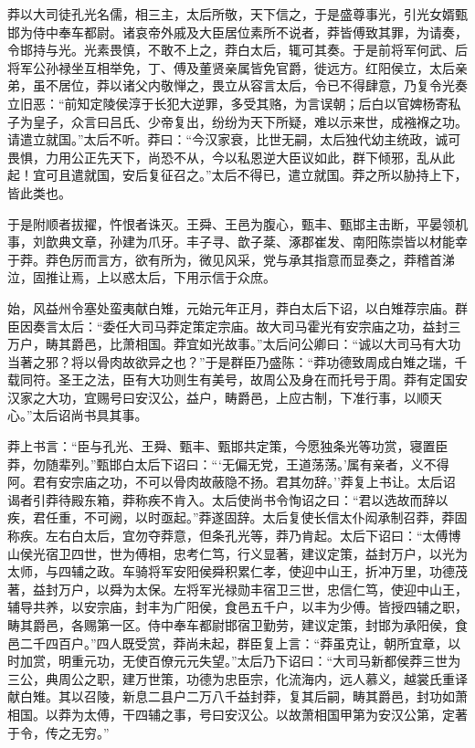 \documentclass[]{article}
\begin{document}
莽以大司徒孔光名儒，相三主，太后所敬，天下信之，于是盛尊事光，引光女婿甄邯为侍中奉车都尉。诸哀帝外戚及大臣居位素所不说者，莽皆傅致其罪，为请奏，令邯持与光。光素畏慎，不敢不上之，莽白太后，辄可其奏。于是前将军何武、后将军公孙禄坐互相举免，丁、傅及董贤亲属皆免官爵，徙远方。红阳侯立，太后亲弟，虽不居位，莽以诸父内敬惮之，畏立从容言太后，令已不得肆意，乃复令光奏立旧恶：``前知定陵侯淳于长犯大逆罪，多受其赂，为言误朝；后白以官婢杨寄私子为皇子，众言曰吕氏、少帝复出，纷纷为天下所疑，难以示来世，成襁褓之功。请遣立就国。''太后不听。莽曰：``今汉家衰，比世无嗣，太后独代幼主统政，诚可畏惧，力用公正先天下，尚恐不从，今以私恩逆大臣议如此，群下倾邪，乱从此起！宜可且遣就国，安后复征召之。''太后不得已，遣立就国。莽之所以胁持上下，皆此类也。

于是附顺者拔擢，忤恨者诛灭。王舜、王邑为腹心，甄丰、甄邯主击断，平晏领机事，刘歆典文章，孙建为爪牙。丰子寻、歆子棻、涿郡崔发、南阳陈崇皆以材能幸于莽。莽色厉而言方，欲有所为，微见风采，党与承其指意而显奏之，莽稽首涕泣，固推让焉，上以惑太后，下用示信于众庶。

始，风益州令塞处蛮夷献白雉，元始元年正月，莽白太后下诏，以白雉荐宗庙。群臣因奏言太后：``委任大司马莽定策定宗庙。故大司马霍光有安宗庙之功，益封三万户，畴其爵邑，比萧相国。莽宜如光故事。''太后问公卿曰：``诚以大司马有大功当著之邪？将以骨肉故欲异之也？''于是群臣乃盛陈：``莽功德致周成白雉之瑞，千载同符。圣王之法，臣有大功则生有美号，故周公及身在而托号于周。莽有定国安汉家之大功，宜赐号曰安汉公，益户，畴爵邑，上应古制，下准行事，以顺天心。''太后诏尚书具其事。

莽上书言：``臣与孔光、王舜、甄丰、甄邯共定策，今愿独条光等功赏，寝置臣莽，勿随辈列。''甄邯白太后下诏曰：```无偏无党，王道荡荡。'属有亲者，义不得阿。君有安宗庙之功，不可以骨肉故蔽隐不扬。君其勿辞。''莽复上书让。太后诏谒者引莽待殿东箱，莽称疾不肯入。太后使尚书令恂诏之曰：``君以选故而辞以疾，君任重，不可阙，以时亟起。''莽遂固辞。太后复使长信太仆闳承制召莽，莽固称疾。左右白太后，宜勿夺莽意，但条孔光等，莽乃肯起。太后下诏曰：``太傅博山侯光宿卫四世，世为傅相，忠考仁笃，行义显著，建议定策，益封万户，以光为太师，与四辅之政。车骑将军安阳侯舜积累仁孝，使迎中山王，折冲万里，功德茂著，益封万户，以舜为太保。左将军光禄勋丰宿卫三世，忠信仁笃，使迎中山王，辅导共养，以安宗庙，封丰为广阳侯，食邑五千户，以丰为少傅。皆授四辅之职，畴其爵邑，各赐第一区。侍中奉车都尉邯宿卫勤劳，建议定策，封邯为承阳侯，食邑二千四百户。''四人既受赏，莽尚未起，群臣复上言：``莽虽克让，朝所宜章，以时加赏，明重元功，无使百僚元元失望。''太后乃下诏曰：``大司马新都侯莽三世为三公，典周公之职，建万世策，功德为忠臣宗，化流海内，远人慕义，越裳氏重译献白雉。其以召陵，新息二县户二万八千益封莽，复其后嗣，畴其爵邑，封功如萧相国。以莽为太傅，干四辅之事，号曰安汉公。以故萧相国甲第为安汉公第，定著于令，传之无穷。''
\end{document}
